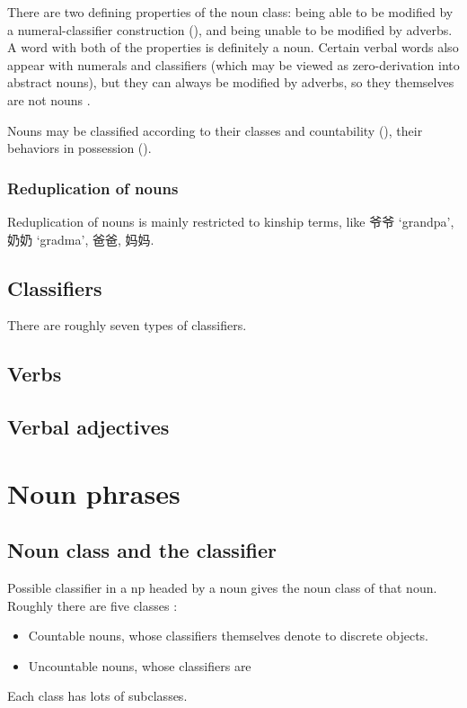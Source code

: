 \documentclass[UTF8, a4paper, oneside, scheme=plain]{ctexart}
\newcommand*{\citesec}[1]{\S~{#1}}
\newcommand{\translate}[1]{`#1'}
\begin{document}
There are two defining properties of the noun class:
being able to be modified by a numeral-classifier construction (),
and being unable to be modified by adverbs. %
A word with both of the properties is definitely a noun.
Certain verbal words also appear with numerals and classifiers 
(which may be viewed as zero-derivation into abstract nouns),
but they can always be modified by adverbs,
so they themselves are not nouns \citep[\citesec{4.1.1}]{zhudexigrammar}.

Nouns may be classified according to 
their classes and countability (),
their behaviors in possession ().

\subsubsection{Reduplication of nouns}\label{sec:reduplication-noun}

Reduplication of nouns is mainly restricted to kinship terms,
like 爷爷 \translate{grandpa}, 奶奶 \translate{gradma}, 爸爸, 妈妈.

\subsection{Classifiers}\label{sec:classifiers}

There are roughly seven types of classifiers. %

\subsection{Verbs}

\subsection{Verbal adjectives}


\section{Noun phrases}

\subsection{Noun class and the classifier}\label{sec:noun-class-classifier}

Possible classifier in a \ac{np} headed by a noun 
gives the noun class of that noun.
Roughly there are five classes \citep[\citesec{4.1.2}]{zhudexigrammar}:
\begin{itemize} %
    \item Countable nouns, whose classifiers themselves denote to discrete objects.
    \item Uncountable nouns, whose classifiers are 
\end{itemize}
Each class has lots of subclasses.
\end{document}
